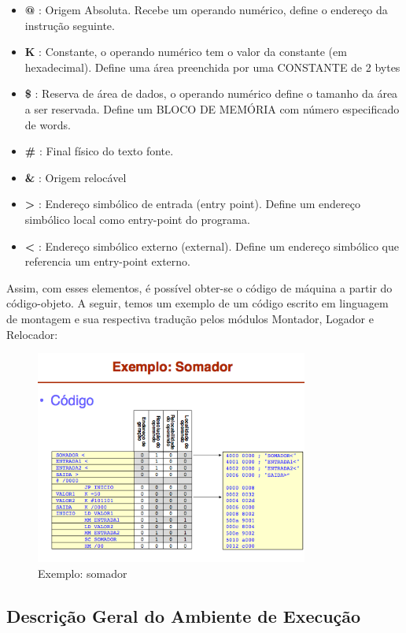 \begin{itemize}
	\item \textbf{@} : Origem Absoluta. Recebe um operando numérico, define o endereço da instrução seguinte.
	\item \textbf{K} : Constante, o operando numérico tem o valor da constante (em hexadecimal). Define uma área preenchida por uma CONSTANTE de 2 bytes
	\item \textbf{\$} : Reserva de área de dados, o operando numérico define o tamanho da área a ser reservada. Define um BLOCO DE MEMÓRIA com número especificado de words.
	\item \textbf{\#} : Final físico do texto fonte.
	\item \textbf{\&} : Origem relocável
	\item \textbf{>} : Endereço simbólico de entrada (entry point). Define um endereço simbólico local como entry-point do programa.
	\item \textbf{<} : Endereço simbólico externo (external). Define um endereço simbólico que referencia um entry-point externo.
\end{itemize}

 
 Assim, com esses elementos, é possível obter-se o código de máquina a partir do código-objeto. A seguir, temos um exemplo de um código escrito em linguagem de montagem e sua respectiva tradução pelos módulos Montador, Logador e Relocador:

\begin{figure}[H]
	\centering 
	\includegraphics[width=0.8\textwidth]{img/somador.png}  
	\caption{Exemplo: somador}
	\label{fig:somador}
\end{figure}

\subsection{Descrição Geral do Ambiente de Execução}
  \label{chap:descricao_ambiente}

